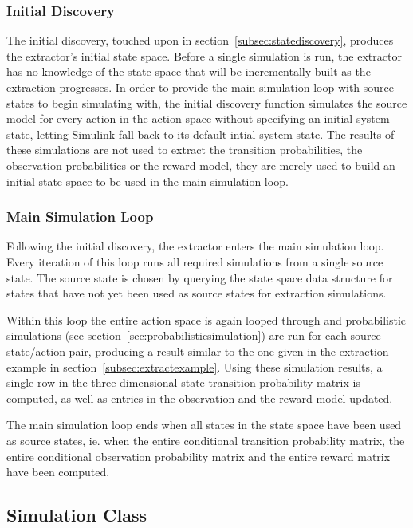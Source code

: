\subsubsection{Initial Discovery}

The initial discovery, touched upon in section~\ref{subsec:statediscovery}, produces the extractor's initial state space. Before a single simulation is run, the extractor has no knowledge of the state space that will be incrementally built as the extraction progresses. In order to provide the main simulation loop with source states to begin simulating with, the initial discovery function simulates the source model for every action in the action space without specifying an initial system state, letting Simulink fall back to its default intial system state. The results of these simulations are not used to extract the transition probabilities, the observation probabilities or the reward model, they are merely used to build an initial state space to be used in the main simulation loop.

\subsubsection{Main Simulation Loop}

Following the initial discovery, the extractor enters the main simulation loop. Every iteration of this loop runs all required simulations from a single source state. The source state is chosen by querying the state space data structure for states that have not yet been used as source states for extraction simulations.

Within this loop the entire action space is again looped through and probabilistic simulations (see section~\ref{sec:probabilisticsimulation}) are run for each source-state/action pair, producing a result similar to the one given in the extraction example in section~\ref{subsec:extractexample}. Using these simulation results, a single row in the three-dimensional state transition probability matrix is computed, as well as entries in the observation and the reward model updated. 

The main simulation loop ends when all states in the state space have been used as source states, ie. when the entire conditional transition probability matrix, the entire conditional observation probability matrix and the entire reward matrix have been computed.

\subsection{Simulation Class}

